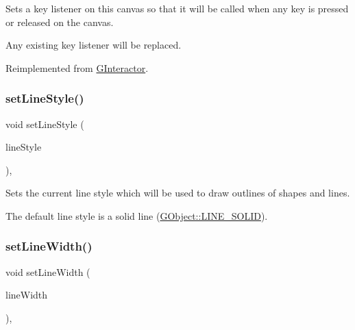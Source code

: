 Sets a key listener on this canvas so that it will be called when any key is pressed or released on the canvas. 

Any existing key listener will be replaced. 

Reimplemented from \mbox{\hyperlink{classGInteractor_ae48ecea73606c7bd9423e1c7cc589cc9}{G\+Interactor}}.

\mbox{\label{classGDrawingSurface_a6bfe14a77101db0fb97b5a7e07a5526b}} 
\subsubsection{\texorpdfstring{set\+Line\+Style()}{setLineStyle()}}
{\footnotesize\ttfamily void set\+Line\+Style (\begin{DoxyParamCaption}\item[{\mbox{\hyperlink{classGObject_a86e0f5648542856159bb40775c854aa7}{G\+Object\+::\+Line\+Style}}}]{line\+Style }\end{DoxyParamCaption})\hspace{0.3cm}{\ttfamily [virtual]}, {\ttfamily [inherited]}}



Sets the current line style which will be used to draw outlines of shapes and lines. 

The default line style is a solid line (\mbox{\hyperlink{classGObject_a86e0f5648542856159bb40775c854aa7a700c78bc2cd76acaab26651bf7b4941f}{G\+Object\+::\+L\+I\+N\+E\+\_\+\+S\+O\+L\+ID}}). \mbox{\label{classGDrawingSurface_afd6a47c6ea6a1f85ca05a65ba3ff3477}} 
\subsubsection{\texorpdfstring{set\+Line\+Width()}{setLineWidth()}}
{\footnotesize\ttfamily void set\+Line\+Width (\begin{DoxyParamCaption}\item[{double}]{line\+Width }\end{DoxyParamCaption})\hspace{0.3cm}{\ttfamily [virtual]}, {\ttfamily [inherited]}}



